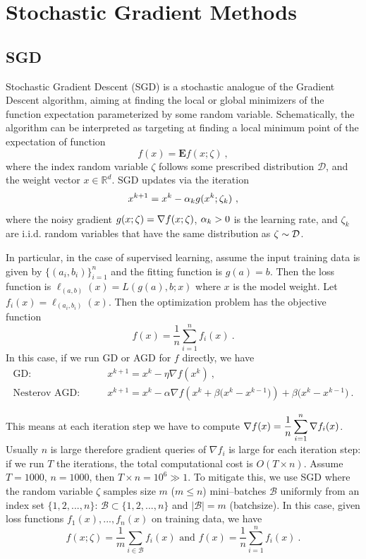 \chapter{Stochastic Gradient Methods}
\label{Ch:SGD}

\section{SGD}

Stochastic Gradient Descent (SGD) is a stochastic analogue of the Gradient Descent algorithm, aiming at finding
the local or global minimizers of the function expectation parameterized by some random variable.
Schematically, the algorithm can be interpreted as targeting at finding a local minimum point of
the expectation of function
\begin{equation}\label{Eq:OptimizationObjective}
f(x)=\mathbf{E} f(x;\zeta) \ ,
\end{equation}
where the index random variable $\zeta$ follows some
prescribed distribution $\mathcal{D}$, and the weight vector $x\in \mathbb{R}^d$.
SGD updates via the iteration
\begin{equation}\label{Eq:StochasticGradientDescent}
x^{k+1}=x^k-\alpha_k g(x^k; \zeta_k) \ ,
\end{equation}
where the noisy gradient $g(x; \zeta)=\nabla f(x; \zeta)$, $\alpha_k>0$ is the learning rate, and $\zeta_k$ are i.i.d. random variables
that have the same distribution as $\zeta\sim \mathcal D$.

In particular, in the case of supervised learning, assume the input training data is given by $\{(a_i, b_i)\}_{i=1}^n$ and the fitting function is $g(a)=b$. Then the loss function is $\ell_{(a,b)}(x)=L(g(a), b; x)$ where $x$ is the model weight. Let $f_i(x)=\ell_{(a_i, b_i)}(x)$. Then the optimization problem has the objective function
$$
f(x)=\frac{1}{n}\sum_{i=1}^n f_i(x) \ .
$$
In this case, if we run GD or AGD for $f$ directly, we have  
$$\begin{array}{ll}
\text{GD:}
& \qquad
x^{k+1} = x^{k} - \eta \nabla f\!\left(x^{k}\right) \ ,
\\
\text{Nesterov AGD:}
& \qquad
x^{k+1}
=
x^{k}
-
\alpha \nabla f\!\left(x^k+\beta\bigl(x^k-x^{k-1}\bigr)\right)
+
\beta\bigl(x^k-x^{k-1}\bigr) \ .
\end{array}$$

This means at each iteration step we have to compute $\displaystyle{\nabla f(x)
= \dfrac{1}{n}\sum_{i=1}^n \nabla f_i(x)}$. 
Usually $n$ is large therefore gradient queries of $\nabla f_i$ is large for each iteration step: if we run $T$ the iterations, the total computational cost is $O(T\times n)$. Assume $T=1000$, $n=1000$, then $T\times n = 10^6 \gg 1$. To mitigate this, we use SGD where the random variable $\zeta$ samples size $m$ ($m\leq n$) mini--batches $\mathcal{B}$ uniformly from an index set $\{1,2,...,n\}$:
$\mathcal{B}\subset \{1,2,...,n\}$ and $|\mathcal{B}|=m$ (batchsize). In this case, given loss functions $f_1(x), ..., f_n(x)$ on
training data, we have
$$f(x; \zeta)=\dfrac{1}{m}\sum\limits_{i\in \mathcal{B}}f_i(x) \text{ and } f(x)=\dfrac{1}{n}\sum\limits_{i=1}^n f_i(x) \ .$$

